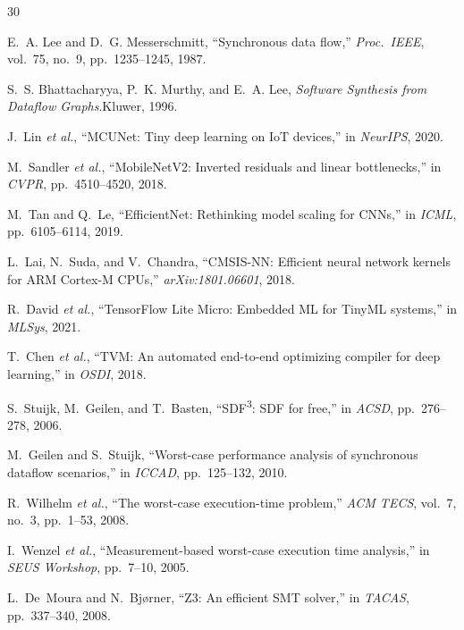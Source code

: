 \documentclass[journal]{IEEEtran}
\begin{document}
\begin{thebibliography}{30}

E.~A. Lee and D.~G. Messerschmitt, ``Synchronous data flow,'' \emph{Proc.\ IEEE}, vol.~75, no.~9, pp.~1235--1245, 1987.

S.~S. Bhattacharyya, P.~K. Murthy, and E.~A. Lee, \emph{Software Synthesis from Dataflow Graphs}.\quad Kluwer, 1996.

J.~Lin \emph{et al.}, ``MCUNet: Tiny deep learning on IoT devices,'' in \emph{NeurIPS}, 2020.

M.~Sandler \emph{et al.}, ``MobileNetV2: Inverted residuals and linear bottlenecks,'' in \emph{CVPR}, pp.~4510--4520, 2018.

M.~Tan and Q.~Le, ``EfficientNet: Rethinking model scaling for CNNs,'' in \emph{ICML}, pp.~6105--6114, 2019.

L.~Lai, N.~Suda, and V.~Chandra, ``CMSIS-NN: Efficient neural network kernels for ARM Cortex-M CPUs,'' \emph{arXiv:1801.06601}, 2018.

R.~David \emph{et al.}, ``TensorFlow Lite Micro: Embedded ML for TinyML systems,'' in \emph{MLSys}, 2021.

T.~Chen \emph{et al.}, ``TVM: An automated end-to-end optimizing compiler for deep learning,'' in \emph{OSDI}, 2018.

S.~Stuijk, M.~Geilen, and T.~Basten, ``SDF\textsuperscript{3}: SDF for free,'' in \emph{ACSD}, pp.~276--278, 2006.

M.~Geilen and S.~Stuijk, ``Worst-case performance analysis of synchronous dataflow scenarios,'' in \emph{ICCAD}, pp.~125--132, 2010.

R.~Wilhelm \emph{et al.}, ``The worst-case execution-time problem,'' \emph{ACM TECS}, vol.~7, no.~3, pp.~1--53, 2008.

I.~Wenzel \emph{et al.}, ``Measurement-based worst-case execution time analysis,'' in \emph{SEUS Workshop}, pp.~7--10, 2005.

L.~De~Moura and N.~Bj{\o}rner, ``Z3: An efficient SMT solver,'' in \emph{TACAS}, pp.~337--340, 2008.


\end{thebibliography}
\end{document}
